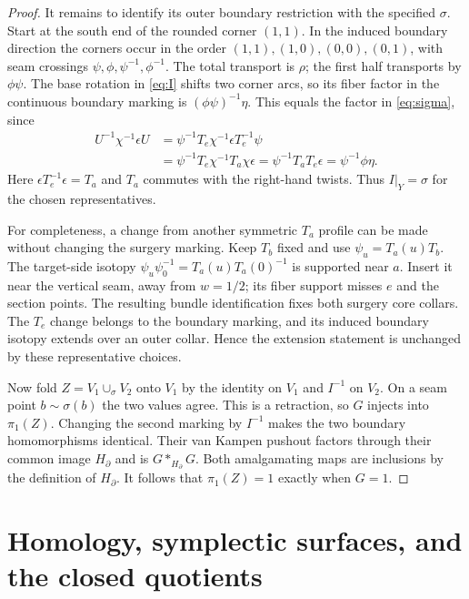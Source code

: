 \documentclass[11pt]{amsart}
\theoremstyle{definition}
\theoremstyle{remark}
\begin{document}
\begin{proof}
It remains to identify its outer boundary restriction with the
specified $\sigma$. Start at the south end of the rounded corner
$(1,1)$. In the induced boundary direction the corners occur in the
order $(1,1),(1,0),(0,0),(0,1)$, with seam crossings
$\psi,\phi,\psi^{-1},\phi^{-1}$. The total transport is $\rho$;
the first half transports by $\phi\psi$. The base rotation in
\eqref{eq:I} shifts two corner arcs, so its fiber factor in the
continuous boundary marking is $(\phi\psi)^{-1}\eta$. This equals
the factor in \eqref{eq:sigma}, since
\begin{align*}
 U^{-1}\chi^{-1}\epsilon U
 &=\psi^{-1}T_e\chi^{-1}\epsilon T_e^{-1}\psi\\
 &=\psi^{-1}T_e\chi^{-1}T_a\chi\epsilon
  =\psi^{-1}T_aT_e\epsilon
  =\psi^{-1}\phi\eta.
\end{align*}
Here $\epsilon T_e^{-1}\epsilon=T_a$ and $T_a$ commutes with
the right-hand twists. Thus $I|_Y=\sigma$ for the chosen representatives.

For completeness, a change from another symmetric $T_a$ profile can
be made without changing the surgery marking. Keep $T_b$ fixed and
use $\psi_u=T_a(u)T_b$. The target-side isotopy
$\psi_u\psi_0^{-1}=T_a(u)T_a(0)^{-1}$ is supported near $a$.
Insert it near the vertical seam, away from $w=1/2$; its fiber support
misses $e$ and the section points. The resulting bundle identification
fixes both surgery core collars. The $T_e$ change belongs to the
boundary marking, and its induced boundary isotopy extends over an
outer collar. Hence the extension statement is unchanged by these
representative choices.

Now fold $Z=V_1\cup_\sigma V_2$ onto $V_1$ by the identity on
$V_1$ and $I^{-1}$ on $V_2$. On a seam point $b\sim\sigma(b)$
the two values agree. This is a retraction, so $G$ injects into
$\pi_1(Z)$. Changing the second marking by $I^{-1}$ makes the
two boundary homomorphisms identical. Their van Kampen pushout
factors through their common image $H_\partial$ and is
$G*_{H_\partial}G$. Both amalgamating maps are inclusions by the
definition of $H_\partial$. It follows that $\pi_1(Z)=1$ exactly
when $G=1$.
\end{proof}

\section{Homology, symplectic surfaces, and the closed quotients}
\label{sec:topology}
\end{document}
